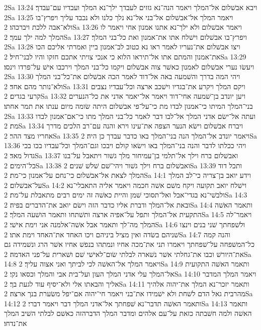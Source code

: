 2Sa 13:24  ויבא אבשׁלום אל־המלך ויאמר הנה־נא גזזים לעבדך ילך־נא המלך ועבדיו עם־עבדך׃
2Sa 13:25  ויאמר המלך אל־אבשׁלום אל־בני אל־נא נלך כלנו ולא נכבד עליך ויפרץ־בו ולא־אבה ללכת ויברכהו׃
2Sa 13:26  ויאמר אבשׁלום ולא ילך־נא אתנו אמנון אחי ויאמר לו המלך למה ילך עמך׃
2Sa 13:27  ויפרץ־בו אבשׁלום וישׁלח אתו את־אמנון ואת כל־בני המלך׃
2Sa 13:28  ויצו אבשׁלום את־נעריו לאמר ראו נא כטוב לב־אמנון ביין ואמרתי אליכם הכו את־אמנון והמתם אתו אל־תיראו הלוא כי אנכי צויתי אתכם חזקו והיו לבני־חיל׃
2Sa 13:29  ויעשׂו נערי אבשׁלום לאמנון כאשׁר צוה אבשׁלום ויקמו כל־בני המלך וירכבו אישׁ על־פרדו וינסו׃
2Sa 13:30  ויהי המה בדרך והשׁמעה באה אל־דוד לאמר הכה אבשׁלום את־כל־בני המלך ולא־נותר מהם אחד׃
2Sa 13:31  ויקם המלך ויקרע את־בגדיו וישׁכב ארצה וכל־עבדיו נצבים קרעי בגדים׃
2Sa 13:32  ויען יונדב בן־שׁמעה אחי־דוד ויאמר אל־יאמר אדני את כל־הנערים בני־המלך המיתו כי־אמנון לבדו מת כי־על־פי אבשׁלום היתה שׂומה מיום ענתו את תמר אחתו׃
2Sa 13:33  ועתה אל־ישׂם אדני המלך אל־לבו דבר לאמר כל־בני המלך מתו כי־אם־אמנון לבדו מת׃
2Sa 13:34  ויברח אבשׁלום וישׂא הנער הצפה את־עינו וירא והנה עם־רב הלכים מדרך אחריו מצד ההר׃
2Sa 13:35  ויאמר יונדב אל־המלך הנה בני־המלך באו כדבר עבדך כן היה׃
2Sa 13:36  ויהי ככלתו לדבר והנה בני־המלך באו וישׂאו קולם ויבכו וגם־המלך וכל־עבדיו בכו בכי גדול מאד׃
2Sa 13:37  ואבשׁלום ברח וילך אל־תלמי בן־עמיחור מלך גשׁור ויתאבל על־בנו כל־הימים׃
2Sa 13:38  ואבשׁלום ברח וילך גשׁור ויהי־שׁם שׁלשׁ שׁנים׃
2Sa 13:39  ותכל דוד המלך לצאת אל־אבשׁלום כי־נחם על־אמנון כי־מת׃
2Sa 14:1  וידע יואב בן־צריה כי־לב המלך על־אבשׁלום׃
2Sa 14:2  וישׁלח יואב תקועה ויקח משׁם אשׁה חכמה ויאמר אליה התאבלי־נא ולבשׁי־נא בגדי־אבל ואל־תסוכי שׁמן והיית כאשׁה זה ימים רבים מתאבלת על־מת׃
2Sa 14:3  ובאת אל־המלך ודברת אליו כדבר הזה וישׂם יואב את־הדברים בפיה׃
2Sa 14:4  ותאמר האשׁה התקעית אל־המלך ותפל על־אפיה ארצה ותשׁתחו ותאמר הושׁעה המלך׃
2Sa 14:5  ויאמר־לה המלך מה־לך ותאמר אבל אשׁה־אלמנה אני וימת אישׁי׃
2Sa 14:6  ולשׁפחתך שׁני בנים וינצו שׁניהם בשׂדה ואין מציל ביניהם ויכו האחד את־האחד וימת אתו׃
2Sa 14:7  והנה קמה כל־המשׁפחה על־שׁפחתך ויאמרו תני את־מכה אחיו ונמתהו בנפשׁ אחיו אשׁר הרג ונשׁמידה גם את־היורשׁ וכבו את־גחלתי אשׁר נשׁארה לבלתי שׂום־לאישׁי שׁם ושׁארית על־פני האדמה׃
2Sa 14:8  ויאמר המלך אל־האשׁה לכי לביתך ואני אצוה עליך׃
2Sa 14:9  ותאמר האשׁה התקועית אל־המלך עלי אדני המלך העון ועל־בית אבי והמלך וכסאו נקי׃
2Sa 14:10  ויאמר המלך המדבר אליך והבאתו אלי ולא־יסיף עוד לגעת בך׃
2Sa 14:11  ותאמר יזכר־נא המלך את־יהוה אלהיך מהרבית גאל הדם לשׁחת ולא ישׁמידו את־בני ויאמר חי־יהוה אם־יפל משׂערת בנך ארצה׃
2Sa 14:12  ותאמר האשׁה תדבר־נא שׁפחתך אל־אדני המלך דבר ויאמר דברי׃
2Sa 14:13  ותאמר האשׁה ולמה חשׁבתה כזאת על־עם אלהים ומדבר המלך הדברהזה כאשׁם לבלתי השׁיב המלך את־נדחו׃
